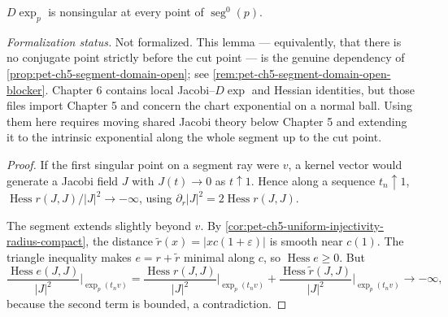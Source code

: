 \begin{lemma}
  \label{lem:pet-ch5-exp-nonsingular-segment-domain}


  $D\exp_p$ is nonsingular at every point of $\operatorname{seg}^0(p)$.

  \emph{Formalization status.} Not formalized. This lemma — equivalently, that
  there is no conjugate point strictly before the cut point — is the genuine
  dependency of \cref{prop:pet-ch5-segment-domain-open}; see
  \cref{rem:pet-ch5-segment-domain-open-blocker}. Chapter 6 contains local
  Jacobi--$D\exp$ and Hessian identities, but those files import Chapter 5 and
  concern the chart exponential on a normal ball. Using them here requires
  moving shared Jacobi theory below Chapter 5 and extending it to the intrinsic
  exponential along the whole segment up to the cut point.
\end{lemma}
\begin{proof}
  \sketch
  If the first singular point on a segment ray were $v$, a kernel vector would
  generate a Jacobi field $J$ with $J(t)\to0$ as $t\uparrow1$.  Hence along a
  sequence $t_n\uparrow1$,
  $\operatorname{Hess}r(J,J)/|J|^2\to-\infty$, using
  $\partial_r|J|^2=2\operatorname{Hess}r(J,J)$.

  The segment extends slightly beyond $v$.  By
  \cref{cor:pet-ch5-uniform-injectivity-radius-compact}, the distance
  $\tilde r(x)=|xc(1+\varepsilon)|$ is smooth near $c(1)$.  The triangle inequality
  makes $e=r+\tilde r$ minimal along $c$, so $\operatorname{Hess}e\ge0$.  But
  \[
    \frac{\operatorname{Hess}e(J,J)}{|J|^2}\Big|_{\exp_p(t_nv)}
    =\frac{\operatorname{Hess}r(J,J)}{|J|^2}\Big|_{\exp_p(t_nv)}
    +\frac{\operatorname{Hess}\tilde r(J,J)}{|J|^2}\Big|_{\exp_p(t_nv)}\to-\infty,
  \]
  because the second term is bounded, a contradiction.
\end{proof}

